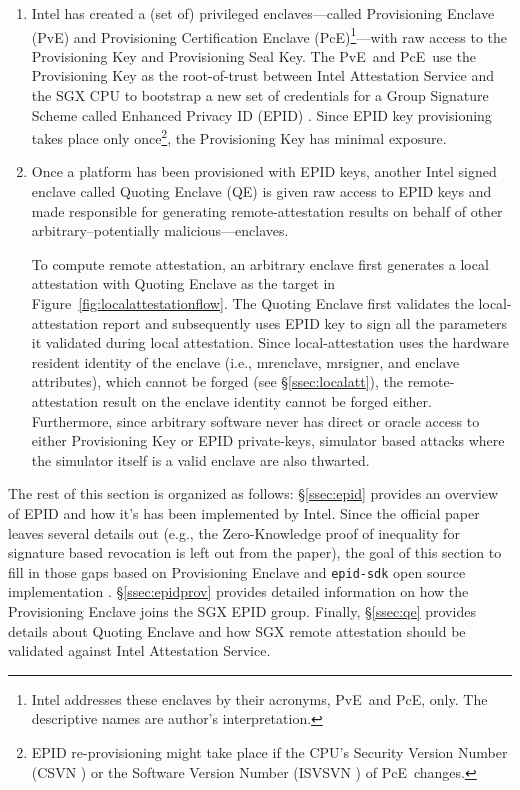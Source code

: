 \documentclass[letterpaper]{article}
\newcommand{\secref}[1]{\S\ref{#1}}
\newcommand{\mrenclave}{\textsf{mrenclave}}
\newcommand{\mrsigner}{\textsf{mrsigner}}
\newcommand{\pve}{\textsf{PvE}}
\newcommand{\pce}{\textsf{PcE}}
\newcommand{\qe}{\textsf{QE}}
\begin{document}
  \begin{enumerate}
    \item Intel has created a (set of) privileged enclaves---called
      \textsf{Provisioning Enclave} (\pve) and \textsf{Provisioning
        Certification Enclave} (\pce)\footnote{Intel addresses these
        enclaves by their acronyms, \pve\ and \pce, only. The
        descriptive names are author's interpretation.}---with raw
      access to the Provisioning Key and Provisioning Seal Key. The
      \pve\ and \pce\ use the Provisioning Key as the root-of-trust
      between Intel Attestation Service and the SGX CPU to bootstrap a
      new set of credentials for a Group Signature Scheme called
      Enhanced Privacy ID (EPID) \cite{epid}. Since EPID key
      provisioning takes place only once\footnote{EPID re-provisioning
        might take place if the CPU's Security Version Number (CSVN
        \cite[\S39.4.2.2]{intelsdm}) or the Software Version Number
        (ISVSVN \cite[\S39.4.2.1]{intelsdm}) of \pce\ changes.}, the
      Provisioning Key has minimal exposure.

    \item Once a platform has been provisioned with EPID keys, another
      Intel signed enclave called \textsf{Quoting Enclave} (\qe) is
      given raw access to EPID keys and made responsible for
      generating remote-attestation results on behalf of other
      arbitrary--potentially malicious---enclaves.

      To compute remote attestation, an arbitrary enclave first
      generates a local attestation with \textsf{Quoting Enclave} as
      the target in Figure~\ref{fig:localattestationflow}. The
      \textsf{Quoting Enclave} first validates the local-attestation
      report and subsequently uses EPID key to sign all the parameters
      it validated during local attestation. Since local-attestation
      uses the hardware resident identity of the enclave (i.e.,
      \mrenclave, \mrsigner, and enclave attributes), which cannot be
      forged (see \secref{ssec:localatt}), the remote-attestation
      result on the enclave identity cannot be forged
      either. Furthermore, since arbitrary software never has direct
      or oracle access to either Provisioning Key or EPID
      private-keys, simulator based attacks where the simulator itself
      is a valid enclave are also thwarted.
  \end{enumerate}

  The rest of this section is organized as follows: \secref{ssec:epid}
  provides an overview of EPID and how it's has been implemented by
  Intel. Since the official \cite{epid} paper leaves several details
  out (e.g., the Zero-Knowledge proof of inequality for signature
  based revocation is left out from the paper), the goal of this
  section to fill in those gaps based on \textsf{Provisioning Enclave}
  and \texttt{epid-sdk} open source implementation
  \cite{epidsdk}. \secref{ssec:epidprov} provides detailed information
  on how the \textsf{Provisioning Enclave} joins the SGX EPID
  group. Finally, \secref{ssec:qe} provides details about
  \textsf{Quoting Enclave} and how SGX remote attestation should be
  validated against Intel Attestation Service.
\end{document}
